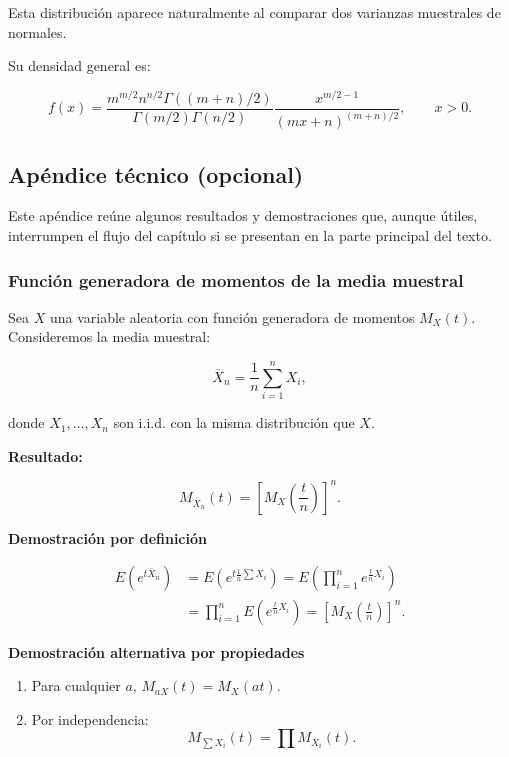 \documentclass[
]{article}
\providecommand{\tightlist}{%
  \setlength{\itemsep}{0pt}\setlength{\parskip}{0pt}}
\begin{document}
Esta distribución aparece naturalmente al comparar dos varianzas muestrales de normales.

Su densidad general es:

\[
f(x)=
\frac{m^{m/2} n^{n/2} \Gamma((m+n)/2)}
{\Gamma(m/2)\Gamma(n/2)}
\frac{x^{m/2-1}}{(mx+n)^{(m+n)/2}},
\qquad x>0.
\]

\subsection{Apéndice técnico (opcional)}\label{apuxe9ndice-tuxe9cnico-opcional}

Este apéndice reúne algunos resultados y demostraciones que, aunque útiles, interrumpen el flujo del capítulo si se presentan en la parte principal del texto.

\subsubsection{Función generadora de momentos de la media muestral}\label{funciuxf3n-generadora-de-momentos-de-la-media-muestral}

Sea \(X\) una variable aleatoria con función generadora de momentos \(M_X(t)\).\\
Consideremos la media muestral:

\[
\bar X_n = \frac{1}{n}\sum_{i=1}^n X_i,
\]

donde \(X_1,\ldots,X_n\) son i.i.d. con la misma distribución que \(X\).

\textbf{Resultado:}

\[
M_{\bar X_n}(t) = \left[ M_X\left(\frac{t}{n}\right) \right]^n.
\]

\textbf{Demostración por definición}

\[
\begin{aligned}
E\left(e^{t\bar X_n}\right)
&= E\left(e^{t\frac{1}{n}\sum X_i}\right)
= E\left(\prod_{i=1}^n e^{\frac{t}{n}X_i}\right)\\[4pt]
&= \prod_{i=1}^n E\left(e^{\frac{t}{n}X_i}\right)
= \left[ M_X\left(\tfrac{t}{n}\right)\right]^n.
\end{aligned}
\]

\textbf{Demostración alternativa por propiedades}

\begin{enumerate}
\def\labelenumi{\arabic{enumi}.}
\tightlist
\item
  Para cualquier \(a\), \(M_{aX}(t)=M_X(at)\).
\item
  Por independencia:
  \[
  M_{\sum X_i}(t)=\prod M_{X_i}(t).
  \]
\end{enumerate}
\end{document}
